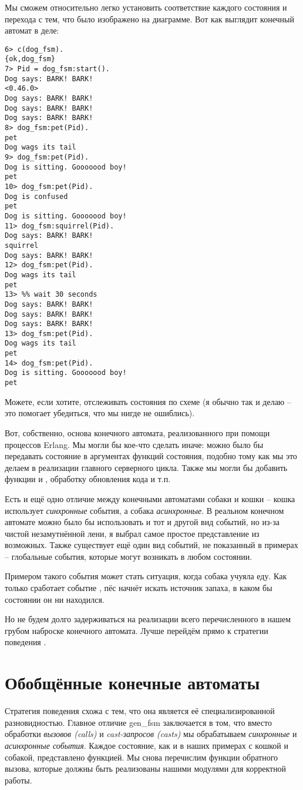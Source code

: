 Мы сможем относительно легко установить соответствие каждого состояния и перехода с тем, что было изображено на диаграмме.
Вот как выглядит конечный автомат в деле:
\begin{lstlisting}[style=erlang]
6> c(dog_fsm).
{ok,dog_fsm}
7> Pid = dog_fsm:start().
Dog says: BARK! BARK!
<0.46.0>
Dog says: BARK! BARK!
Dog says: BARK! BARK!
Dog says: BARK! BARK!
8> dog_fsm:pet(Pid).
pet
Dog wags its tail
9> dog_fsm:pet(Pid).
Dog is sitting. Gooooood boy!
pet
10> dog_fsm:pet(Pid).
Dog is confused
pet
Dog is sitting. Gooooood boy!
11> dog_fsm:squirrel(Pid).
Dog says: BARK! BARK!
squirrel
Dog says: BARK! BARK!   
12> dog_fsm:pet(Pid).
Dog wags its tail
pet
13> %% wait 30 seconds
Dog says: BARK! BARK!
Dog says: BARK! BARK!
Dog says: BARK! BARK!    
13> dog_fsm:pet(Pid).    
Dog wags its tail
pet
14> dog_fsm:pet(Pid).
Dog is sitting. Gooooood boy!
pet
\end{lstlisting}

Можете, если хотите, отслеживать состояния по схеме (я обычно так и делаю \--- это помогает убедиться, что мы нигде не ошиблись).

Вот, собственно, основа конечного автомата, реализованного при помощи процессов Erlang.
Мы могли бы кое\--что сделать иначе: можно было бы передавать состояние в аргументах функций состояния, подобно тому как мы это делаем в реализации главного серверного цикла.
Также мы могли бы добавить функции  и , обработку обновления кода и т.п.

Есть и ещё одно отличие между конечными автоматами собаки и кошки \--- кошка использует \emph{синхронные} события, а собака \emph{асинхронные}.
В реальном конечном автомате можно было бы использовать и тот и другой вид событий, но из\--за чистой незамутнённой лени, я выбрал самое простое представление из возможных.
Также существует ещё один вид событий, не показанный в примерах \--- глобальные события, которые могут возникать в любом состоянии.

Примером такого события может стать ситуация, когда собака учуяла еду.
Как только сработает событие , пёс начнёт искать источник запаха, в каком бы состоянии он ни находился. 

Но не будем долго задерживаться на реализации всего перечисленного в нашем грубом наброске конечного автомата.
Лучше перейдём прямо к стратегии поведения .
\section{Обобщённые конечные автоматы}
\label{generic-finite-state-machines}
Стратегия поведения  схожа с  тем, что она является её специализированной разновидностью.
Главное отличие gen\_fsm заключается в том, что вместо обработки \emph{вызовов (calls)} и \emph{cast-запросов (casts)} мы обрабатываем \emph{синхронные} и \emph{асинхронные события}.
Каждое состояние, как и в наших примерах с кошкой и собакой, представлено функцией.
Мы снова перечислим функции обратного вызова, которые должны быть реализованы нашими модулями для корректной работы.

